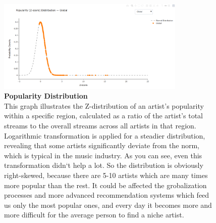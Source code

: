 \documentclass{article}
\begin{document}
\begin{figure}[htbp]
    \centering
    \includegraphics[width=0.8\textwidth]{data/report_figures/graph1_spotify.png}
    \caption{\textbf{Popularity Distribution} \\
    This graph illustrates the Z-distribution of an artist's popularity within a specific region, calculated as a ratio of the artist's total streams to the overall streams across all artists in that region. Logarithmic transformation is applied for a steadier distribution, revealing that some artists 	significantly deviate from the norm, which is typical in the music industry. As you can see, even this transformation didn`t help a lot. So the distribution is obviously right-skewed, because there are 5-10 artists which are many times more popular than the rest. It could be affected the grobalization processes and more advanced
recommendation systems which feed us only the most popular ones, and every day it becomes more and more difficult for the average person to find a niche artist.}
    \label{fig:spotify1}
\end{figure}
\end{document}

